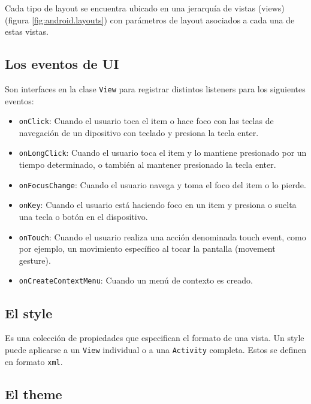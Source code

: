 Cada tipo de layout se encuentra ubicado en una jerarqu\'ia de vistas (views) (figura \ref{fig:android.layouts}) con par\'ametros de layout asociados a cada una de estas vistas. 


\subsection{Los eventos de \ac{UI}}
\label{subsec:dev.ui.events}

Son interfaces en la clase \texttt{View} para registrar distintos listeners para los siguientes eventos:

\begin{itemize}
\item \texttt{onClick}: Cuando el usuario toca el item o hace foco con las teclas de navegaci\'on de un dipositivo con teclado y presiona la tecla enter.
\item \texttt{onLongClick}: Cuando el usuario toca el item y lo mantiene presionado por un tiempo determinado, o tambi\'en al mantener presionado la tecla enter. 
\item \texttt{onFocusChange}: Cuando el usuario navega y toma el foco del item o lo pierde.
\item \texttt{onKey}: Cuando el usuario est\'a haciendo foco en un item y presiona o suelta una tecla o bot\'on en el dispositivo.
\item \texttt{onTouch}: Cuando el usuario realiza una acci\'on denominada touch event, como por ejemplo, un movimiento espec\'ifico al tocar la pantalla (movement gesture).
\item \texttt{onCreateContextMenu}: Cuando un men\'u de contexto es creado.
\end{itemize}

\subsection{El style}
\label{subsec:dev.style}

Es una colecci\'on de propiedades que especifican el formato de una vista. Un style puede aplicarse a un \texttt{View} individual o a una \texttt{Activity} completa. Estos se definen en formato \texttt{xml}.

\subsection{El theme}
\label{subsec:dev.theme}


